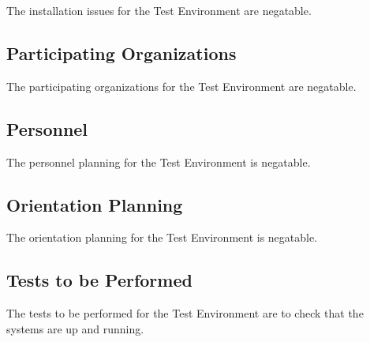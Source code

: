 The installation issues for the \TestEnvName\xspace Test Environment are negatable.


\subsection{Participating Organizations}
\label{loc:Organizations\TestEnvName}


The participating organizations for the \TestEnvName\xspace Test Environment are negatable.


\subsection{Personnel}
\label{loc:Personnel\TestEnvName}


The personnel planning for the \TestEnvName\xspace Test Environment is negatable.


\subsection{Orientation Planning}
\label{loc:Orientation\TestEnvName}


The orientation planning for the \TestEnvName\xspace Test Environment is negatable.


\subsection{Tests to be Performed}
\label{loc:Tests\TestEnvName}


The tests to be performed for the \TestEnvName\xspace Test Environment are to check that the systems are up and running.%

